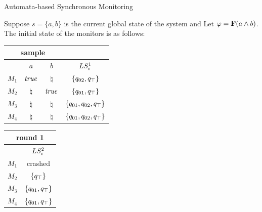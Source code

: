 \begin{frame}{Automata-based Synchronous Monitoring}

\begin{example}


Suppose $s=\{a,b\}$ is the current global state of the system and Let $\varphi = \mathbf{F} (a \wedge b)$. The initial state of the monitors is as follows:\\


\begin{center}

\begin{tabular}{| c |c |c |c|}
\multicolumn{3}{c}{sample} \\
\hline
&$a$&$b$&$LS_i^1$\\
\hline
$M_1$ & $\mathit{true}$  & $\natural$ & $\{q_{02}, q_\top\}$\\
$M_2$ & $\natural$ & $\mathit{true}$ &  $\{q_{01}, q_\top\}$\\
$M_3$ & $\natural$ & $\natural$ &  $\{q_{01},q_{02}, 
q_\top\}$ \\
$M_4$ & $\natural$ & $\natural$ &  $\{q_{01}, q_{02}, 
q_\top\}$\\
\hline
\end{tabular} 
\quad
\begin{tabular}{| c |c|}
\multicolumn{2}{c}{round 1} \\
\hline
&$LS_i^2$\\
\hline
$M_1$ & crashed\\
$M_2$ & $\{q_\top\}$\\
$M_3$ & $\{q_{01}, q_\top\}$ \\
$M_4$ & $\{q_{01}, q_\top\}$ \\
\hline
\end{tabular}
\end{center}

\begin{center}


\end{center}
\end{example}
\end{frame}
